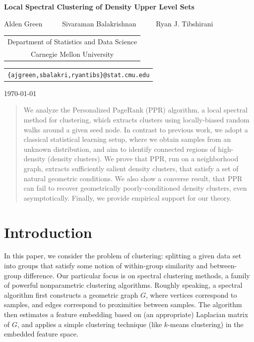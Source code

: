 \documentclass[11pt,twoside]{article}
\theoremstyle{definition}
\newcommand{\1}{\mathbbm{1}}
\begin{document}
\begin{center} {\Large{\bf{Local Spectral Clustering of Density Upper Level Sets}}}

\vspace*{.3cm}

{\large{
\begin{center}
Alden Green~~~~~ Sivaraman Balakrishnan~~~~~ Ryan J. Tibshirani\\
\vspace{.2cm}
\end{center}


\begin{tabular}{c}
Department of Statistics and Data Science \\
Carnegie Mellon University
\end{tabular}

\vspace*{.2in}

\begin{tabular}{c}
\texttt{\{ajgreen,sbalakri,ryantibs\}@stat.cmu.edu}
\end{tabular}
}}

\vspace*{.2in}

\today
\vspace*{.2in}

\begin{abstract}
We analyze the Personalized PageRank (PPR) algorithm, a local spectral method
for clustering, which extracts clusters using locally-biased random walks around
a given seed node.  In contrast to previous work, we adopt a classical
statistical learning setup, where we obtain samples from an unknown
distribution, and aim to identify connected regions of high-density (density
clusters).  We prove that PPR, run on a neighborhood graph, extracts
sufficiently salient density clusters, that satisfy a set of natural geometric
conditions. We also show a converse result, that PPR can fail to recover
geometrically poorly-conditioned density clusters, even asymptotically. Finally,
we provide empirical support for our theory.
\end{abstract}
\end{center}

\section{Introduction}
\label{sec: introduction}

In this paper, we consider the problem of clustering: splitting a given data set
into groups that satisfy some notion of within-group similarity and
between-group difference.  Our particular focus is on spectral clustering
methods, a family of powerful nonparametric clustering algorithms. Roughly
speaking, a spectral algorithm first constructs a geometric graph $G$, where
vertices correspond to samples, and edges correspond to proximities between
samples. The algorithm then estimates a feature embedding based on (an
appropriate) Laplacian matrix of $G$, and applies a simple clustering technique
(like $k$-means clustering) in the embedded feature space.
\end{document}
